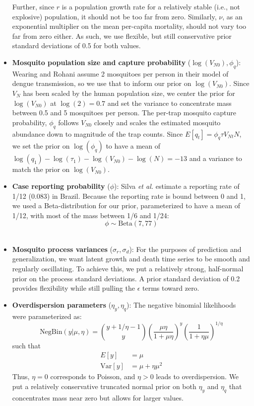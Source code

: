\documentclass[12pt,letterpaper]{article}
\begin{document}
\begin{itemize}
Further, since $r$ is a population growth rate for a relatively stable (i.e., not explosive) population, it should not be too far from zero.
Similarly, $\nu$, as an exponential multiplier on the mean per-capita mortality, should not vary too far from zero either.
As such, we use flexible, but still conservative prior standard deviations of 0.5 for both values.  
\\
\item \textbf{Mosquito population size and capture probability} ($\log(V_{N0}), \phi_q$): Wearing and Rohani \cite{Wearing2006} assume 2 mosquitoes per person in their model of dengue transmission, so we use that to inform our prior on $\log(V_{N0})$.
Since $V_{N}$ has been scaled by the human population size, we center the prior for $\log(V_{N0})$ at $\log(2) = 0.7$ and set the variance to concentrate mass between 0.5 and 5 mosquitoes per person.
The per-trap mosquito capture probability, $\phi_q$ follows $V_{N0}$ closely and scales the estimated mosquito abundance down to magnitude of the trap counts.
Since $ E[q_t] = \phi_q \tau V_{Nt} N$, we set the prior on $\log(\phi_q)$ to have a mean of $\log(q_1) - \log(\tau_1) - \log(V_{N0}) - \log(N) = -13$ and a variance to match the prior on $\log(V_{N0})$.
\\
\item \textbf{Case reporting probability} ($\phi$): Silva \emph{et al.} \cite{Silva2016} estimate a reporting rate of 1/12 (0.083) in Brazil.
Because the reporting rate is bound between 0 and 1, we used a Beta-distribution for our prior, parameterized to have a mean of 1/12, with most of the mass between 1/6 and 1/24:
\begin{equation}
\phi \sim \text{Beta}(7, 77)
\end{equation} 
\\
\item \textbf{Mosquito process variances} ($\sigma_r, \sigma_d$): For the purposes of prediction and generalization, we want latent growth and death time series to be smooth and regularly oscillating.
To achieve this, we put a relatively strong, half-normal prior on the process standard deviations.
A prior standard deviation of 0.2 provides flexibility while still pulling the $\epsilon$ terms toward zero.
\\
\item \textbf{Overdispersion parameters} ($\eta_y, \eta_q$): The negative binomial likelihoods were parameterized as:
\begin{equation}
\text{NegBin}(y | \mu, \eta) = {y + 1/\eta -1 \choose y}\left(\frac{\mu\eta}{1 + \mu\eta}\right)^y\left(\frac{1}{1+\eta\mu}\right)^{1/\eta}
\end{equation}
such that
\begin{align}
E[y] & = \mu\\
\text{Var}[y] &= \mu + \eta\mu^2
\end{align}
Thus, $\eta = 0$ corresponds to Poisson, and $\eta > 0$ leads to overdispersion.
We put a relatively conservative truncated normal prior on both $\eta_y$ and $\eta_q$ that concentrates mass near zero but allows for larger values.
\end{itemize}
\end{document}
